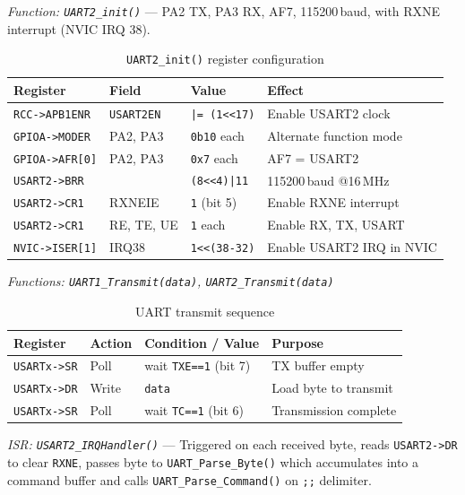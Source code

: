 \documentclass[12pt,a4paper]{article}
\begin{document}
\textit{Function: \texttt{UART2\_init()}} — PA2 TX, PA3 RX, AF7, 115200\,baud, with RXNE interrupt (NVIC IRQ 38).

\begin{table}[H]
\centering
\begin{tabular}{llll}
\hline
\textbf{Register} & \textbf{Field} & \textbf{Value} & \textbf{Effect} \\
\hline
\texttt{RCC->APB1ENR} & \texttt{USART2EN} & \texttt{|= (1<<17)} & Enable USART2 clock \\
\texttt{GPIOA->MODER} & PA2, PA3 & \texttt{0b10} each & Alternate function mode \\
\texttt{GPIOA->AFR[0]} & PA2, PA3 & \texttt{0x7} each & AF7 = USART2 \\
\texttt{USART2->BRR}  & & \texttt{(8<<4)|11} & 115200\,baud @16\,MHz \\
\texttt{USART2->CR1}  & RXNEIE & \texttt{1} (bit 5) & Enable RXNE interrupt \\
\texttt{USART2->CR1}  & RE, TE, UE & \texttt{1} each & Enable RX, TX, USART \\
\texttt{NVIC->ISER[1]} & IRQ38 & \texttt{1<<(38-32)} & Enable USART2 IRQ in NVIC \\
\hline
\end{tabular}
\caption{\texttt{UART2\_init()} register configuration}
\end{table}

\textit{Functions: \texttt{UART1\_Transmit(data)}, \texttt{UART2\_Transmit(data)}}

\begin{table}[H]
\centering
\begin{tabular}{llll}
\hline
\textbf{Register} & \textbf{Action} & \textbf{Condition / Value} & \textbf{Purpose} \\
\hline
\texttt{USARTx->SR} & Poll & wait \texttt{TXE==1} (bit 7) & TX buffer empty \\
\texttt{USARTx->DR} & Write & \texttt{data} & Load byte to transmit \\
\texttt{USARTx->SR} & Poll & wait \texttt{TC==1} (bit 6)  & Transmission complete \\
\hline
\end{tabular}
\caption{UART transmit sequence}
\end{table}

\textit{ISR: \texttt{USART2\_IRQHandler()}} — Triggered on each received byte, reads \texttt{USART2->DR} to clear \texttt{RXNE}, passes byte to \texttt{UART\_Parse\_Byte()} which accumulates into a command buffer and calls \texttt{UART\_Parse\_Command()} on \texttt{;;} delimiter.
\end{document}
